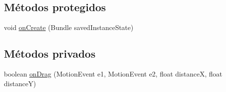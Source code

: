 \subsection*{Métodos protegidos}
\begin{DoxyCompactItemize}
\item 
void \hyperlink{classes_1_1ucm_1_1tfg_1_1controlremotolinux_1_1client_1_1controller_1_1CanvasActivity_acf75cc7d2c377828d1867dbb7db18a5c}{on\-Create} (Bundle saved\-Instance\-State)
\end{DoxyCompactItemize}
\subsection*{Métodos privados}
\begin{DoxyCompactItemize}
\item 
boolean \hyperlink{classes_1_1ucm_1_1tfg_1_1controlremotolinux_1_1client_1_1controller_1_1CanvasActivity_a09ced297c15e7eb11f05d7319e626916}{on\-Drag} (Motion\-Event e1, Motion\-Event e2, float distance\-X, float distance\-Y)
\end{DoxyCompactItemize}
